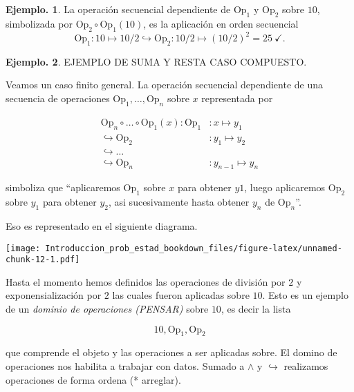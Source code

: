 \documentclass[]{book}
\theoremstyle{definition}
\theoremstyle{definition}
\newtheorem{example}{Ejemplo.}[chapter]
\theoremstyle{definition}
\theoremstyle{remark}
\begin{document}
\begin{example}
\protect\hypertarget{exm:unnamed-chunk-10}{}{\label{exm:unnamed-chunk-10} }
La operación secuencial dependiente de \(\mbox{Op}_1\) y
\(\mbox{Op}_2\) sobre \(10\), simbolizada por \(\mbox{Op}_2 \circ \mbox{Op}_1(10)\), es la aplicación en orden secuencial\\
\[ \mbox{Op}_1: 10 \mapsto 10/2  \hookrightarrow  \mbox{Op}_2: 10/2 \mapsto (10/2)^2 = 25 \ \checkmark .
\]
\end{example}

\begin{example}
\protect\hypertarget{exm:unnamed-chunk-11}{}{\label{exm:unnamed-chunk-11} }
EJEMPLO DE SUMA Y RESTA CASO COMPUESTO.
\end{example}

Veamos un caso finito general. La operación secuencial dependiente
de una secuencia de operaciones \(\mbox{Op}_1, \ldots, \mbox{Op}_n\) sobre \(x\) representada por

\[ \begin{aligned}
 \mbox{Op}_{n}\circ \ldots \circ \mbox{Op}_1(x): \mbox{Op}_1 &:
 x \mapsto y_1 \\
   \hookrightarrow  \mbox{Op}_2 &: y_1 \mapsto y_2 \\
  \hookrightarrow  \ldots & \\
  \hookrightarrow  \mbox{Op}_n &: y_{n-1} \mapsto y_n 
   \end{aligned} \]

simboliza que ``aplicaremos \(\mbox{Op}_1\) sobre \(x\) para obtener \(y1\), luego aplicaremos \(\mbox{Op}_2\) sobre \(y_1\) para
obtener \(y_2\), asi sucesivamente hasta obtener \(y_n\) de \(\mbox{Op}_n\)''.

Eso es representado en el siguiente diagrama.

\texttt{[image: Introduccion\_prob\_estad\_bookdown\_files/figure-latex/unnamed-chunk-12-1.pdf]}

Hasta el momento hemos definidos las operaciones de división por
\(2\) y exponensialización por \(2\) las cuales fueron aplicadas
sobre \(10\). Esto es un ejemplo de un \emph{dominio de operaciones (PENSAR)}
sobre \(10\), es decir la lista

\[  10, \mbox{Op}_1, \mbox{Op}_2 \]

que comprende el objeto y las operaciones a ser aplicadas sobre.
El domino de operaciones nos habilita a trabajar con datos. Sumado
a \(\wedge\) y \(\hookrightarrow\) realizamos operaciones de forma
ordena (* arreglar).
\end{document}
